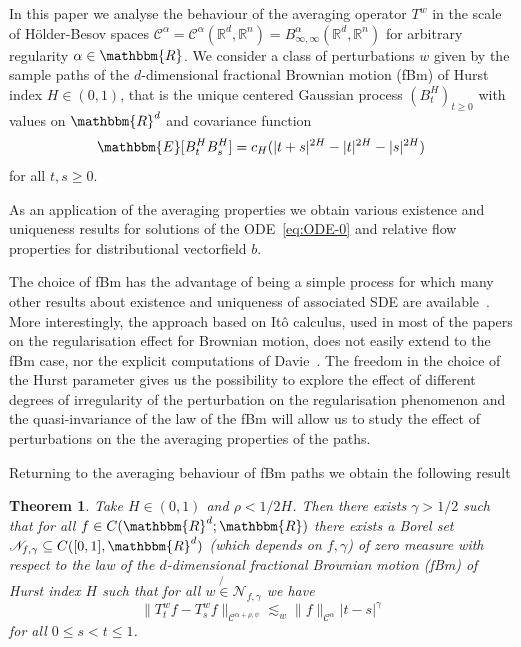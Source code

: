\documentclass[a4paper,11pt]{article}
\newtheorem{theorem}{Theorem}[section]
\newcommand{\CC}{\mathscr C}
\newcommand{\CN}{\mathscr N}
\newcommand{\RR}{\mathbb R}
\begin{document}
In this paper we analyse the behaviour of the averaging operator $T^{w}$ in
the scale of H\"older-Besov spaces $\CC^{\alpha} = \CC^{\alpha} ( \RR^{d} ,
\RR^{n} ) =B^{\alpha}_{\infty , \infty} ( \RR^{d} , \RR^{n} )$ for arbitrary
regularity $\alpha \in \mathbbm{R}$. We consider a class of perturbations $w$
given by the sample paths of the $d$-dimensional fractional Brownian motion
(fBm) of Hurst index $H \in ( 0,1 )$, that is the unique centered Gaussian
process $( B^{H}_{t} )_{t \geqslant 0}$ with values on $\mathbbm{R}^{d}$ and
covariance function
\[ \mathbbm{E} [ B^{H}_{t} B_{s}^{H} ] =c_{H} ( | t+s |^{2H} - | t |^{2H} - |
   s |^{2H} ) \]
for all $t,s \geqslant 0$.

As an application of the averaging properties we obtain various existence and
uniqueness results for solutions of the ODE~{\eqref{eq:ODE-0}} and relative
flow properties for distributional vectorfield $b$.



The choice of fBm has the advantage of being a simple process for which many
other results about existence and uniqueness of associated SDE are
available~{\cite{MR1934157}}. More interestingly, the approach based on Itô
calculus, used in most of the papers on the regularisation effect for Brownian
motion, does not easily extend to the fBm case, nor the explicit computations
of Davie~{\cite{MR2377011}}. The freedom in the choice of the Hurst parameter
gives us the possibility to explore the effect of different degrees of
irregularity of the perturbation on the regularisation phenomenon and the
quasi-invariance of the law of the fBm will allow us to study the effect of
perturbations on the the averaging properties of the paths.



Returning to the averaging behaviour of fBm paths we obtain the following
result

\begin{theorem}
  \label{th:regularization-fbm}Take $H \in ( 0,1 )$ and $\rho <1/2H$. Then
  there exists $\gamma >1/2$ such that for all $f \in C ( \mathbbm{R}^{d}
  ;\mathbbm{R} )$ there exists a Borel set $\CN_{f, \gamma} \subseteq
  C ( [ 0,1 ] ,\mathbbm{R}^{d} )$ (which depends on $f, \gamma$) of zero
  measure with respect to the law of the $d$-dimensional fractional Brownian
  motion (fBm) of Hurst index $H$ such that for all $w \not{\in}
  \CN_{f, \gamma}$ we have
  \[ \| T^{w}_{t} f-T^{w}_{s} f \|_{\CC^{\alpha + \rho , \psi}} \lesssim_{w}
     \| f \|_{\CC^{\alpha}} | t-s |^{\gamma} \]
  for all $0 \leqslant s<t \leqslant 1$.
\end{theorem}
\end{document}
